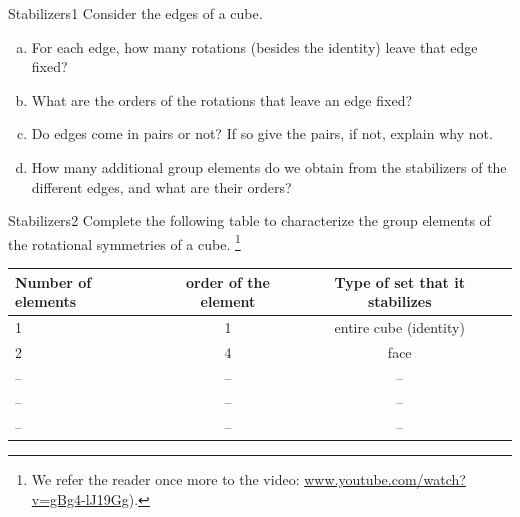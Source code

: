 \begin{exercise}{Stabilizers1}
Consider the edges of a cube.
\begin{enumerate}[(a)]
\item
For each edge, how many rotations (besides the identity) leave that edge fixed?
\item
What are the orders of the rotations that leave an edge fixed?
\item
Do edges come in pairs or not?  If so give the pairs, if not, explain why not.
\item
How many additional group elements do we obtain from the stabilizers of the different edges, and what are their orders? 
\end{enumerate}
\end{exercise}
\begin{exercise}{Stabilizers2}
Complete the following table to characterize the group elements of the rotational symmetries of a cube.
\footnote{We refer the reader once more to the video: \url{www.youtube.com/watch?v=gBg4-lJ19Gg}).}

\begin{tabular}{| l |c|c| r |}\hline
  Number of elements & order of the element & Type of set that it stabilizes \\ \hline
  1 & 1 & entire cube (identity) \\ \hline
  2 & 4 & face \\ \hline
 -- & -- & -- \\ \hline
-- & -- & -- \\ \hline
-- & -- & -- \\ \hline
\end{tabular}
\end{exercise}

